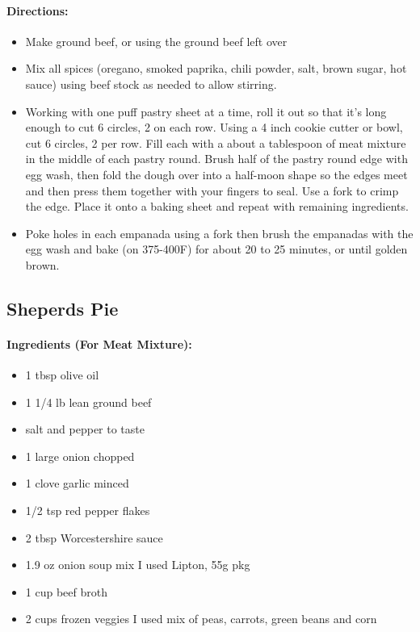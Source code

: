 \documentclass{article}
\begin{document}
\paragraph{Directions:}
\begin{itemize}
    \item Make ground beef, or using the ground beef left over
    \item Mix all spices (oregano, smoked paprika, chili powder, salt, brown sugar, hot sauce) using beef stock as needed to allow stirring.
    \item Working with one puff pastry sheet at a time, roll it out so that it’s long enough to cut 6 circles, 2 on each row. Using a 4 inch cookie cutter or bowl, cut 6 circles, 2 per row. Fill each with a about a tablespoon of meat mixture in the middle of each pastry round. Brush half of the pastry round edge with egg wash, then fold the dough over into a half-moon shape so the edges meet and then press them together with your fingers to seal. Use a fork to crimp the edge. Place it onto a baking sheet and repeat with remaining ingredients.
    \item Poke holes in each empanada using a fork then brush the empanadas with the egg wash and bake (on 375-400F) for about 20 to 25 minutes, or until golden brown.
\end{itemize}

\subsection{Sheperds Pie} 

\paragraph{Ingredients (For Meat Mixture):}
\begin{itemize}
    \item 1 tbsp olive oil
    \item 1 1/4 lb lean ground beef
    \item salt and pepper to taste
    \item 1 large onion chopped
    \item 1 clove garlic minced
    \item 1/2 tsp red pepper flakes
    \item 2 tbsp Worcestershire sauce
    \item 1.9 oz onion soup mix I used Lipton, 55g pkg
    \item 1 cup beef broth
    \item 2 cups frozen veggies I used mix of peas, carrots, green beans and corn
\end{itemize}  
\end{document}
